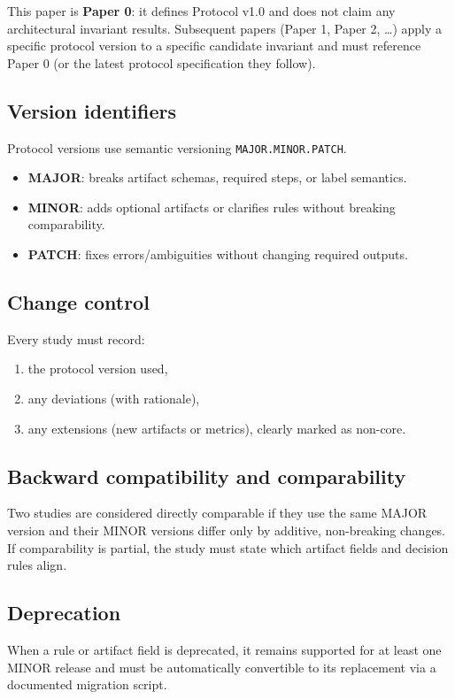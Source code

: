 This paper is \textbf{Paper 0}: it defines Protocol v1.0 and does not claim any architectural invariant results. Subsequent papers (Paper 1, Paper 2, \ldots) apply a specific protocol version to a specific candidate invariant and must reference Paper 0 (or the latest protocol specification they follow).

\subsection*{Version identifiers}
Protocol versions use semantic versioning \texttt{MAJOR.MINOR.PATCH}.
\begin{itemize}[leftmargin=*]
  \item \textbf{MAJOR}: breaks artifact schemas, required steps, or label semantics.
  \item \textbf{MINOR}: adds optional artifacts or clarifies rules without breaking comparability.
  \item \textbf{PATCH}: fixes errors/ambiguities without changing required outputs.
\end{itemize}

\subsection*{Change control}
Every study must record:
\begin{enumerate}[leftmargin=*]
  \item the protocol version used,
  \item any deviations (with rationale),
  \item any extensions (new artifacts or metrics), clearly marked as non-core.
\end{enumerate}

\subsection*{Backward compatibility and comparability}
Two studies are considered directly comparable if they use the same MAJOR version and their MINOR versions differ only by additive, non-breaking changes. If comparability is partial, the study must state which artifact fields and decision rules align.

\subsection*{Deprecation}
When a rule or artifact field is deprecated, it remains supported for at least one MINOR release and must be automatically convertible to its replacement via a documented migration script.